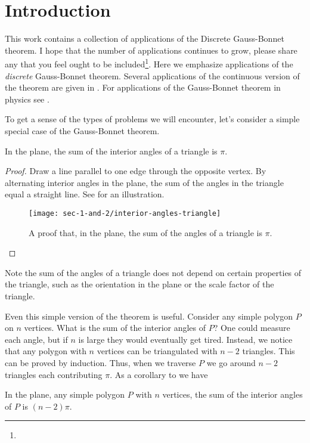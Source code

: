\section{Introduction}
\label{sec:intro}

This work contains a collection of applications of the 
Discrete Gauss-Bonnet theorem.
I hope that the number of applications continues to grow,
please share any that you feel
ought to  be included\footnote{}.
Here we emphasize applications of the \emph{discrete} Gauss-Bonnet
theorem. Several applications of the continuous version of the theorem
are given in \cite{doc76}.
For applications of the Gauss-Bonnet theorem in physics see \cite{tirado-physics-apps}.


To get a sense of the types of problems we will encounter,
let's consider a simple special case of the Gauss-Bonnet theorem.
\begin{theorem}\label{thm:triangle}
In the plane, the sum of the interior angles of a triangle is $\pi$.
\end{theorem}
\begin{proof}
Draw a line parallel to one edge through the opposite vertex.
By alternating interior angles in the plane, the sum of the angles
in the triangle equal  a straight line.
See  for an illustration. 



\begin{figure}[htb]
\centering
\texttt{[image: sec-1-and-2/interior-angles-triangle]}
\caption{A proof that, in the plane, the sum of the angles of a triangle is $\pi$.}
\label{fig:angles}
\end{figure}

\end{proof}

Note the sum of the angles of a triangle does not
depend on certain properties of the  triangle, such as the orientation in the plane or
the scale factor of the triangle.


Even this simple version of the theorem is useful.
Consider any simple polygon $P$ on $n$ vertices. 
What is the sum of the interior angles of $P$?
One could measure each angle, but if $n$ is large they would eventually
get tired.
Instead, we notice that any polygon with $n$ vertices can be
triangulated with $n-2$ triangles. This can be proved by induction.
Thus, when we traverse $P$ we go around $n-2$ triangles each contributing
$\pi$.
As a corollary to  we have
\begin{corollary}\label{cor:angles}
In the plane, any simple polygon $P$ with $n$ vertices,
the sum of the interior angles of $P$ is $(n-2)\pi$.

\end{corollary}

